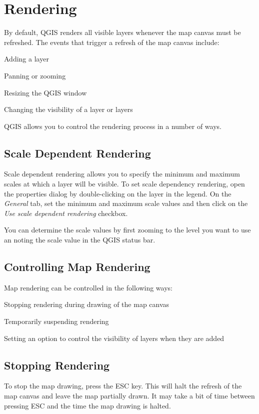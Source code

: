 \section{Rendering}\label{subsec:redraw_events}
By default, QGIS renders all visible layers whenever the map canvas must be refreshed. The events that trigger a refresh of the map canvas include:
\begin{compactitem}
\item Adding a layer
\item Panning or zooming
\item Resizing the QGIS window
\item Changing the visibility of a layer or layers
\end{compactitem}
QGIS allows you to control the rendering process in a number of ways.

\subsection{Scale Dependent Rendering}
Scale dependent rendering allows you to specify the minimum and maximum scales
at which a layer will be visible.  To set scale dependency rendering, open the
properties dialog by double-clicking on the layer in the legend. On the
\textit{General} tab, set the minimum and maximum scale values and then click on
the \textit{Use scale dependent rendering} checkbox.

You can determine the scale values by first zooming to the level you want to use
an noting the scale value in the QGIS status bar.
\subsection{Controlling Map Rendering}
Map rendering can be controlled in the following ways:
\begin{compactenum}
\item Stopping rendering during drawing of the map canvas
\item Temporarily suspending rendering
\item Setting an option to control the visibility of layers when they are added
\end{compactenum}
\subsection{Stopping Rendering}
To stop the map drawing, press the ESC key. This will halt the refresh of the
map canvas and leave the map partially drawn. It may take a bit of time between
pressing ESC and the time the map drawing is halted.
